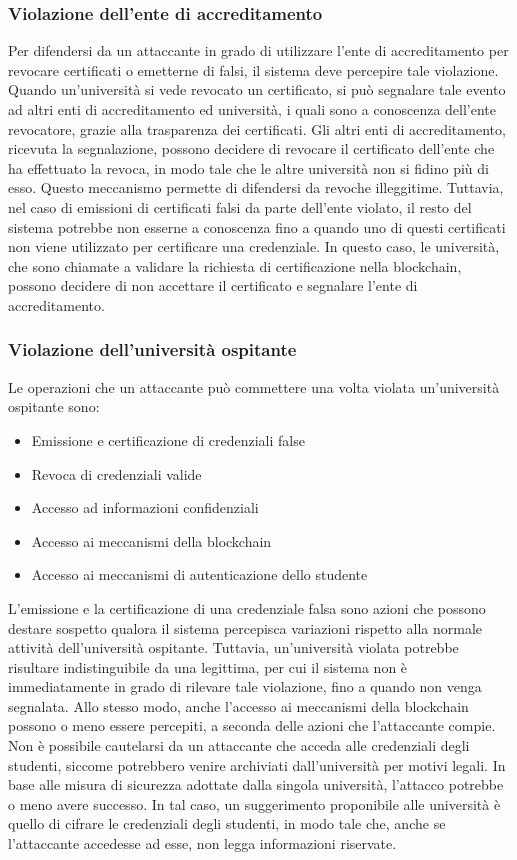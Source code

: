 \documentclass[a4paper,12pt]{article}
\begin{document}
\subsubsection{Violazione dell’ente di accreditamento}
Per difendersi da un attaccante in grado di utilizzare l'ente di accreditamento per revocare certificati o emetterne di falsi, il sistema deve percepire tale violazione. 
Quando un'università si vede revocato un certificato, si può segnalare tale evento ad altri enti di accreditamento ed università, i quali sono a conoscenza dell'ente revocatore, grazie alla trasparenza dei certificati.
Gli altri enti di accreditamento, ricevuta la segnalazione, possono decidere di revocare il certificato dell'ente che ha effettuato la revoca, in modo tale che le altre università non si fidino più di esso. Questo meccanismo permette di difendersi da revoche illeggitime. 
\newline Tuttavia, nel caso di emissioni di certificati falsi da parte dell'ente violato, il resto del sistema potrebbe non esserne a conoscenza fino a quando uno di questi certificati non viene utilizzato per certificare una credenziale. In questo caso, le università, che sono chiamate a validare la richiesta di certificazione nella blockchain, possono decidere di non accettare il certificato e segnalare l'ente di accreditamento.

\subsubsection{Violazione dell’università ospitante}
Le operazioni che un attaccante può commettere una volta violata un'università ospitante sono:
\begin{itemize}
    \item Emissione e certificazione di credenziali false
    \item Revoca di credenziali valide
    \item Accesso ad informazioni confidenziali
    \item Accesso ai meccanismi della blockchain
    \item Accesso ai meccanismi di autenticazione dello studente 
\end{itemize}
L'emissione e la certificazione di una credenziale falsa sono azioni che possono destare sospetto qualora il sistema percepisca variazioni rispetto alla normale attività dell'università ospitante. 
Tuttavia, un'università violata potrebbe risultare indistinguibile da una legittima, per cui il sistema non è immediatamente in grado di rilevare tale violazione, fino a quando non venga segnalata.
Allo stesso modo, anche l'accesso ai meccanismi della blockchain possono o meno essere percepiti, a seconda delle azioni che l'attaccante compie.
\newline  Non è possibile cautelarsi da un attaccante che acceda alle credenziali degli studenti, siccome potrebbero venire archiviati dall'università per motivi legali. In base alle misura di sicurezza adottate dalla singola università, l'attacco potrebbe o meno avere successo. In tal caso, un suggerimento proponibile alle università è quello di cifrare le credenziali degli studenti, in modo tale che, anche se l'attaccante accedesse ad esse, non legga informazioni riservate.
\end{document}
